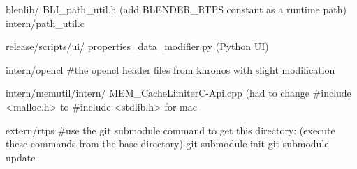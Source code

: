     blenlib/
        BLI_path_util.h     (add BLENDER_RTPS constant as a runtime path)
        intern/path_util.c

release/scripts/ui/
    properties_data_modifier.py (Python UI)

intern/opencl
    #the opencl header files from khronos with slight modification

intern/memutil/intern/
    MEM_CacheLimiterC-Api.cpp (had to change #include <malloc.h> to #include <stdlib.h> for mac

extern/rtps
    #use the git submodule command to get this directory: (execute these commands from the base directory)
        git submodule init
        git submodule update





